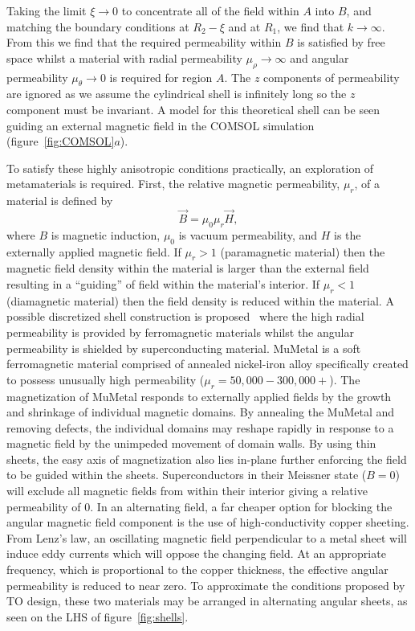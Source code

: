 \documentclass[11pt]{iopart}
\begin{document}
\vspace{-0.2em}
Taking the limit $\xi \rightarrow 0$ to concentrate all of
the field within $A$ into $B$, and matching the boundary conditions at
$R_2-\xi$ and at $R_1$, we find that $k \rightarrow \infty$. From this
we find that the required permeability within $B$ is satisfied by free
space whilst a material with radial permeability $\mu_\rho \rightarrow
\infty$ and angular permeability $\mu_\theta \rightarrow 0$ is
required for region $A$. The $z$ components of permeability are ignored
as we assume the cylindrical shell is
infinitely long so the $z$ component must be invariant. A model for
this theoretical shell can be seen guiding an external magnetic field
in the COMSOL simulation (figure~\ref{fig:COMSOL}$a$).

To satisfy these highly anisotropic conditions practically, an
exploration of metamaterials is required. First, the relative magnetic
permeability, $\mu_r$, of a material is defined by
\vspace{-0.2em}
\begin{equation}
  \vec{B} = \mu_0\mu_r \vec{H},
\end{equation}
\vspace{-0.2em}
where $B$ is magnetic induction, $\mu_0$ is vacuum permeability, and
$H$ is the externally applied magnetic field. If $\mu_r>1$ 
(paramagnetic material) then the magnetic field density within the
material is larger than the external field resulting in a ``guiding''
of field within the material's interior. If $\mu_r<1$ 
(diamagnetic material) then the field density is reduced within the material.
A possible discretized shell construction
is proposed~\cite{N2014} where the high radial permeability is
provided by ferromagnetic materials whilst the angular permeability is
shielded by superconducting material.
MuMetal is a soft ferromagnetic material comprised of annealed
nickel-iron alloy specifically created to possess unusually high
permeability ($\mu_r = 50,000-300,000+$).  The magnetization of
MuMetal responds to externally applied fields by the growth and
shrinkage of individual magnetic domains. By annealing the MuMetal and
removing defects, the individual domains may reshape rapidly in
response to a magnetic field by the unimpeded movement of domain
walls.
By using thin sheets, the
easy axis of magnetization also lies in-plane further enforcing the
field to be guided within the sheets. Superconductors in their
Meissner state ($B = 0$) will exclude all magnetic fields from within
their interior giving a relative permeability of $0$. In an
alternating field, a far cheaper option for blocking the angular
magnetic field component is the use of high-conductivity copper
sheeting. From Lenz's law, an oscillating magnetic field perpendicular
to a metal sheet will induce eddy currents which will oppose the
changing field. At an appropriate frequency, which is
proportional to the copper thickness, the effective angular
permeability is reduced to near zero. To approximate the conditions
proposed by TO design, these two materials may be arranged in
alternating angular sheets, as seen on the LHS of figure~\ref{fig:shells}.
\end{document}
